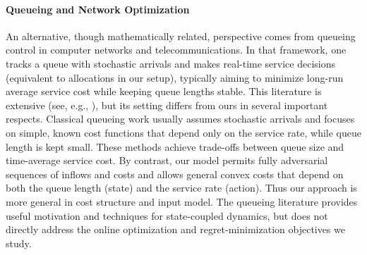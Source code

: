 \documentclass[11pt]{article}
\begin{document}




\paragraph{Queueing and Network Optimization}

An alternative, though mathematically related, perspective comes from queueing control in computer networks and telecommunications. In that framework, one tracks a queue with stochastic arrivals and makes real-time service decisions (equivalent to allocations in our setup), typically aiming to minimize long-run average service cost while keeping queue lengths stable. This literature is extensive (see, e.g., \cite{tassiulas1990stability,tassiulas1993dynamic,mckeown1999achieving,neely2010stochastic}), but its setting differs from ours in several important respects. Classical queueing work usually assumes stochastic arrivals and focuses on simple, known cost functions that depend only on the service rate, while queue length is kept small. These methods achieve trade-offs between queue size and time-average service cost. By contrast, our model permits fully adversarial sequences of inflows and costs and allows general convex costs that depend on both the queue length (state) and the service rate (action). Thus our approach is more general in cost structure and input model. The queueing literature provides useful motivation and techniques for state-coupled dynamics, but does not directly address the online optimization and regret-minimization objectives we study.
\end{document}
